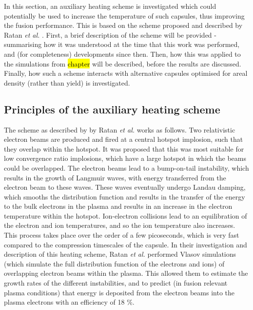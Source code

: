 In this section, an auxiliary heating scheme is investigated which could potentially be used to increase the temperature of such capsules, thus improving the fusion performance. This is based on the scheme proposed and described by Ratan \textit{et al.} \cite{Ratan2017}. First, a brief description of the scheme will be provided - summarising how it was understood at the time that this work was performed, and (for completeness) developments since then. Then, how this was applied to the simulations from \hl{chapter} will be described, before the results are discussed. Finally, how such a scheme interacts with alternative capsules optimised for areal density (rather than yield) is investigated.

\subsection{Principles of the auxiliary heating scheme}

The scheme as described by by Ratan \textit{et al.} \cite{Ratan2017} works as follows. Two relativistic electron beams are produced and fired at a central hotspot implosion, such that they overlap within the hotspot. It was proposed that this was most suitable for low convergence ratio implosions, which have a large hotspot in which the beams could be overlapped. The electron beams lead to a bump-on-tail instability, which results in the growth of Langmuir waves, with energy transferred from the electron beam to these waves. These waves eventually undergo Landau damping, which smooths the distribution function and results in the transfer of the energy to the bulk electrons in the plasma and results in an increase in the electron temperature within the hotspot. Ion-electron collisions lead to an equilibration of the electron and ion temperatures, and so the ion temperature also increases. This process takes place over the order of a few picoseconds, which is very fast compared to the compression timescales of the capsule. In their investigation and description of this heating scheme, Ratan \textit{et al.} performed Vlasov simulations (which simulate the full distribution function of the electrons and ions) of overlapping electron beams within the plasma. This allowed them to estimate the growth rates of the different instabilities, and to predict (in fusion relevant plasma conditions) that energy is deposited from the electron beams into the plasma electrons with an efficiency of 18 \%.

